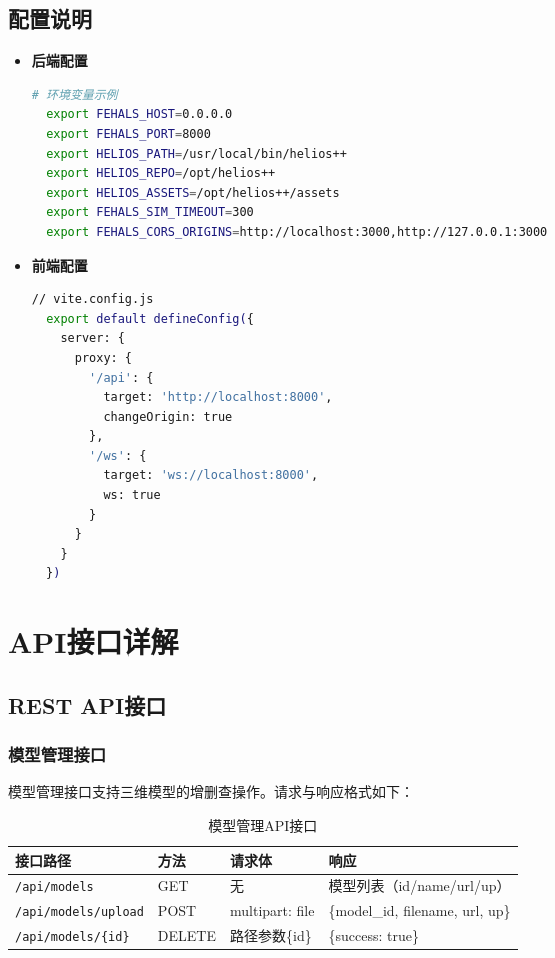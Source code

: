 \documentclass[a4paper,fleqn]{cas-sc}
\begin{document}
\subsection{配置说明}
\begin{itemize}
    \item \textbf{后端配置}
          \begin{lstlisting}[language=bash]
  # 环境变量示例
  export FEHALS_HOST=0.0.0.0
  export FEHALS_PORT=8000
  export HELIOS_PATH=/usr/local/bin/helios++
  export HELIOS_REPO=/opt/helios++
  export HELIOS_ASSETS=/opt/helios++/assets
  export FEHALS_SIM_TIMEOUT=300
  export FEHALS_CORS_ORIGINS=http://localhost:3000,http://127.0.0.1:3000
  \end{lstlisting}

    \item \textbf{前端配置}
          \begin{lstlisting}[language=bash]
  // vite.config.js
  export default defineConfig({
    server: {
      proxy: {
        '/api': {
          target: 'http://localhost:8000',
          changeOrigin: true
        },
        '/ws': {
          target: 'ws://localhost:8000',
          ws: true
        }
      }
    }
  })
  \end{lstlisting}
\end{itemize}

\section{API接口详解}\label{sec:api}

\subsection{REST API接口}

\subsubsection{模型管理接口}
模型管理接口支持三维模型的增删查操作。请求与响应格式如下：

\begin{table}[pos=!htbp]
    \centering
    \caption{模型管理API接口}
    \label{tab:api-models}
    \begin{tabular}{@{} llll @{}}
        \toprule
        \textbf{接口路径}               & \textbf{方法} & \textbf{请求体}    & \textbf{响应}                      \\
        \midrule
        \texttt{/api/models}        & GET         & 无               & 模型列表（id/name/url/up）             \\
        \texttt{/api/models/upload} & POST        & multipart: file & \{model\_id, filename, url, up\} \\
        \texttt{/api/models/\{id\}} & DELETE      & 路径参数\{id\}      & \{success: true\}                \\
        \bottomrule
    \end{tabular}
\end{table}
\end{document}
